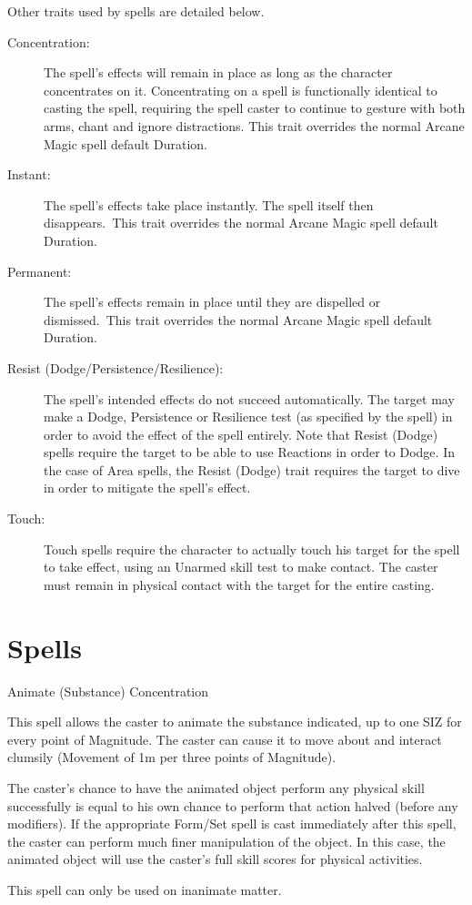 Other traits used by spells are detailed below. 
\begin{description}
	\item[Concentration:] The spell’s effects will remain in place as long as the character concentrates on it. Concentrating on a spell is functionally identical to casting the spell, requiring the spell caster to continue to gesture with both arms, chant and ignore distractions. This trait overrides the normal Arcane Magic spell default Duration. 
	\item[Instant:] The spell’s effects take place instantly. The spell itself then disappears. This trait overrides the normal Arcane Magic spell default Duration. 
	\item[Permanent:] The spell’s effects remain in place until they are dispelled or dismissed. This trait overrides the normal Arcane Magic spell default Duration.
	\item[Resist (Dodge/Persistence/Resilience):] The spell’s intended effects do not succeed automatically. The target may make a Dodge, Persistence or Resilience test (as specified by the spell) in order to avoid the effect of the spell entirely. Note that Resist (Dodge) spells require the target to be able to use Reactions in order to Dodge. In the case of Area spells, the Resist (Dodge) trait requires the target to dive in order to mitigate the spell’s effect. 
	\item[Touch:] Touch spells require the character to actually touch his target for the spell to take effect, using an Unarmed skill test to make contact. The caster must remain in physical contact with the target for the entire casting.
\end{description}

\section{Spells}

\begin{rpg-spell}
{Animate (Substance)}
{Concentration}

This spell allows the caster to animate the substance indicated, up to one SIZ for every point of Magnitude. The caster can cause it to move about and interact clumsily (Movement of 1m per three points of Magnitude). 

The caster’s chance to have the animated object perform any physical skill successfully is equal to his own chance to perform that action halved (before any modifiers). If the appropriate Form/Set spell is cast immediately after this spell, the caster can perform much finer manipulation of the object. In this case, the animated object will use the caster’s full skill scores for physical activities. 

This spell can only be used on inanimate matter. 
\end{rpg-spell}


